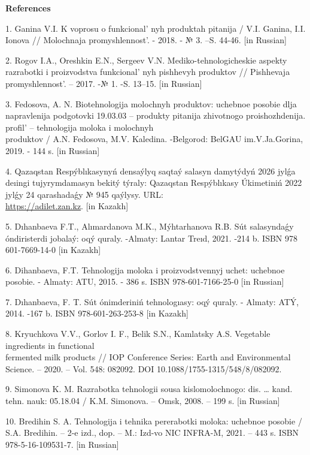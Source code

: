 \begin{center}
{\bfseries References}
\end{center}

\begin{references}
1. Ganina V.I. K voprosu o funkcional' nyh produktah
pitanija / V.I. Ganina, I.I. Ionova // Molochnaja
promyshlennost'. - 2018. - № 3. --S. 44-46. {[}in
Russian{]}

2. Rogov I.A., Oreshkin E.N., Sergeev V.N. Mediko-tehnologicheskie
aspekty razrabotki i proizvodstva funkcional' nyh
pishhevyh produktov // Pishhevaja promyshlennost'. --
2017. -№ 1. -S. 13--15. {[}in Russian{]}

3. Fedosova, A. N. Biotehnologija molochnyh produktov: uchebnoe posobie
dlja napravlenija podgotovki 19.03.03 -- produkty pitanija zhivotnogo
proishozhdenija. profil'{} -- tehnologija moloka i
molochnyh \\produktov / A.N. Fedosova, M.V. Kaledina. -Belgorod: BelGAU
im.V.Ja.Gorina, 2019. - 144 s. {[}in Russian{]}

4. Qazaqstan Respýblıkasynyń densaýlyq saqtaý salasyn damytýdyń 2026
jylǵa deıingi tujyrymdamasyn bekitý týraly: Qazaqstan Respýblıkasy
Úkimetiniń 2022 jylǵy 24 qarashadaǵy № 945 qaýlysy. URL:\\
\href{https://adilet.zan.kz/kaz/docs/P2200000945}{https://adilet.zan.kz}. {[}in Kazakh{]}

5. Dıhanbaeva F.T., Alımardanova M.K., Mýhtarhanova R.B. Sút salasyndaǵy
óndiristerdi jobalaý: oqý quraly. -Almaty: Lantar Treıd, 2021. -214 b.
ISBN 978 601-7669-14-0 {[}in Kazakh{]}

6. Dihanbaeva, F.T. Tehnologija moloka i proizvodstvennyj uchet: uchebnoe
posobie. - Almaty: ATU, 2015. - 386 s. ISBN 978-601-7166-25-0 {[}in
Russian{]}

7. Dıhanbaeva, F. T. Sút ónimderiniń tehnologıasy: oqý quraly. - Almaty:
ATÝ, 2014. -167 b. ISBN 978-601-263-253-8 {[}in Kazakh{]}

8. Kryuchkova V.V., Gorlov I. F., Belik S.N., Kamlatsky A.S. Vegetable
ingredients in functional \\fermented milk products // IOP Conference
Series: Earth and Environmental Science. -- 2020. -- Vol. 548:
082092. DOI 10.1088/1755-1315/548/8/082092.

9. Simonova K. M. Razrabotka tehnologii sousa kislomolochnogo: dis.
\ldots{} kand. tehn. nauk: 05.18.04 / K.M. Simonova. -- Omsk, 2008. --
199 s. {[}in Russian{]}

10. Bredihin S. A. Tehnologija i tehnika pererabotki moloka: uchebnoe
posobie / S.A. Bredihin. -- 2-e izd., dop. -- M.: Izd-vo NIC INFRA-M,
2021. -- 443 s. ISBN 978-5-16-109531-7. {[}in Russian{]}


\end{references}
